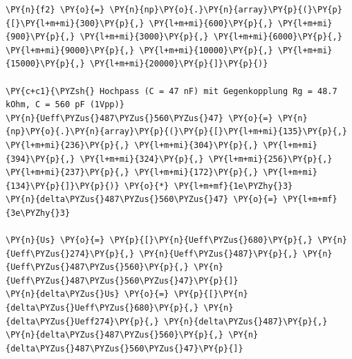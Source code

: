     \begin{tcolorbox}[breakable, size=fbox, boxrule=1pt, pad at break*=1mm,colback=cellbackground, colframe=cellborder]
\begin{Verbatim}[commandchars=\\\{\}]
\PY{n}{f2} \PY{o}{=} \PY{n}{np}\PY{o}{.}\PY{n}{array}\PY{p}{(}\PY{p}{[}\PY{l+m+mi}{300}\PY{p}{,} \PY{l+m+mi}{600}\PY{p}{,} \PY{l+m+mi}{900}\PY{p}{,} \PY{l+m+mi}{3000}\PY{p}{,} \PY{l+m+mi}{6000}\PY{p}{,} \PY{l+m+mi}{9000}\PY{p}{,} \PY{l+m+mi}{10000}\PY{p}{,} \PY{l+m+mi}{15000}\PY{p}{,} \PY{l+m+mi}{20000}\PY{p}{]}\PY{p}{)}

\PY{c+c1}{\PYZsh{} Hochpass (C = 47 nF) mit Gegenkopplung Rg = 48.7 kOhm, C = 560 pF (1Vpp)}
\PY{n}{Ueff\PYZus{}487\PYZus{}560\PYZus{}47} \PY{o}{=} \PY{n}{np}\PY{o}{.}\PY{n}{array}\PY{p}{(}\PY{p}{[}\PY{l+m+mi}{135}\PY{p}{,} \PY{l+m+mi}{236}\PY{p}{,} \PY{l+m+mi}{304}\PY{p}{,} \PY{l+m+mi}{394}\PY{p}{,} \PY{l+m+mi}{324}\PY{p}{,} \PY{l+m+mi}{256}\PY{p}{,} \PY{l+m+mi}{237}\PY{p}{,} \PY{l+m+mi}{172}\PY{p}{,} \PY{l+m+mi}{134}\PY{p}{]}\PY{p}{)} \PY{o}{*} \PY{l+m+mf}{1e\PYZhy{}3}
\PY{n}{delta\PYZus{}487\PYZus{}560\PYZus{}47} \PY{o}{=} \PY{l+m+mf}{3e\PYZhy{}3}

\PY{n}{Us} \PY{o}{=} \PY{p}{[}\PY{n}{Ueff\PYZus{}680}\PY{p}{,} \PY{n}{Ueff\PYZus{}274}\PY{p}{,} \PY{n}{Ueff\PYZus{}487}\PY{p}{,} \PY{n}{Ueff\PYZus{}487\PYZus{}560}\PY{p}{,} \PY{n}{Ueff\PYZus{}487\PYZus{}560\PYZus{}47}\PY{p}{]}
\PY{n}{delta\PYZus{}Us} \PY{o}{=} \PY{p}{[}\PY{n}{delta\PYZus{}Ueff\PYZus{}680}\PY{p}{,} \PY{n}{delta\PYZus{}Ueff274}\PY{p}{,} \PY{n}{delta\PYZus{}487}\PY{p}{,} \PY{n}{delta\PYZus{}487\PYZus{}560}\PY{p}{,} \PY{n}{delta\PYZus{}487\PYZus{}560\PYZus{}47}\PY{p}{]}
\end{Verbatim}
\end{tcolorbox}

